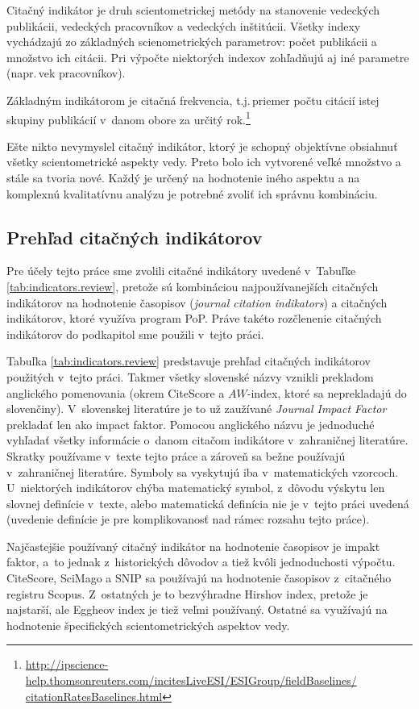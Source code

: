 Citačný indikátor je druh scientometrickej metódy na stanovenie 
vedeckých publikácii, vedeckých pracovníkov a vedeckých inštitúcii.  Všetky
indexy vychádzajú zo základných scienometrických parametrov: počet publikácii a
množstvo ich citácii.  Pri výpočte niektorých indexov zohľadňujú aj iné
parametre (napr.\,vek pracovníkov).

Základným indikátorom je citačná frekvencia, t.j.\,priemer počtu citácií istej
skupiny publikácií v~danom obore za určitý
rok.\footnote{\url{http://ipscience-help.thomsonreuters.com/incitesLiveESI/ESIGroup/fieldBaselines/
citationRatesBaselines.html}}

Ešte nikto nevymyslel citačný indikátor, ktorý je schopný objektívne obsiahnuť
všetky scientometrické aspekty vedy. Preto bolo ich vytvorené veľké množstvo a
stále sa tvoria nové. Každý je určený na hodnotenie iného aspektu a na
komplexnú kvalitatívnu analýzu je potrebné zvoliť ich správnu kombináciu.

\subsection{Prehľad citačných indikátorov}

Pre účely tejto práce sme zvolili citačné indikátory uvedené v~Tabuľke
\ref{tab:indicators.review}, pretože sú kombináciou najpoužívanejších citačných
indikátorov na hodnotenie časopisov (\emph{journal citation indikators}) a
citačných indikátorov, ktoré využíva program PoP.
Práve takéto rozčlenenie citačných indikátorov do podkapitol sme použili
v~tejto práci.

Tabuľka \ref{tab:indicators.review} predstavuje prehľad citačných indikátorov
použitých v~tejto práci. Takmer všetky slovenské názvy vznikli prekladom
anglického pomenovania (okrem CiteScore a $AW$-index, ktoré sa neprekladajú do
slovenčiny).  V~slovenskej literatúre je to už zaužívané \emph{Journal Impact
Factor} prekladať len ako impact faktor.  Pomocou anglického názvu je
jednoduché vyhľadať všetky informácie o~danom citačom indikátore v~zahraničnej
literatúre. Skratky používame v~texte tejto práce a zároveň sa bežne používajú
v~zahraničnej literatúre. Symboly sa vyskytujú iba v~matematických vzorcoch.
U~niektorých indikátorov chýba matematický symbol, z~dôvodu výskytu len slovnej
definície v~texte, alebo matematická definícia nie je v~tejto práci uvedená
(uvedenie definície je pre komplikovanosť nad rámec rozsahu tejto práce).

Najčastejšie používaný citačný indikátor na hodnotenie časopisov je impakt faktor, a~to
jednak z~historických dôvodov a tiež kvôli jednoduchosti výpočtu. CiteScore, SciMago a
SNIP sa používajú na hodnotenie časopisov z~citačného registru Scopus.
Z~ostatných je to bezvýhradne Hirshov index, pretože je najstarší, ale Eggheov
index je tiež veľmi používaný.  Ostatné sa využívajú na hodnotenie špecifických
scientometrických aspektov vedy.


